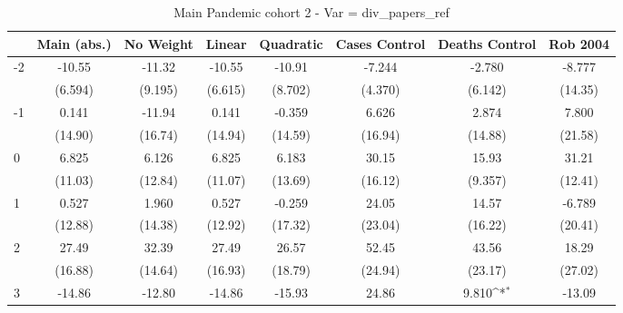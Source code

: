 \documentclass{article}
\begin{document}
{
\def\sym#1{\ifmmode^{#1}\else\(^{#1}\)\fi}
\begin{longtable}{l*{7}{c}}
\caption{Main Pandemic cohort 2 - Var = div\_papers\_ref}\\
\hline\hline\endfirsthead\hline\endhead\hline\endfoot\endlastfoot
                &\multicolumn{1}{c}{Main (abs.)}&\multicolumn{1}{c}{No Weight}&\multicolumn{1}{c}{Linear}&\multicolumn{1}{c}{Quadratic}&\multicolumn{1}{c}{Cases Control}&\multicolumn{1}{c}{Deaths Control}&\multicolumn{1}{c}{Rob 2004}\\
\hline
-2              &   -10.55         &   -11.32         &   -10.55         &   -10.91         &   -7.244         &   -2.780         &   -8.777         \\
                &  (6.594)         &  (9.195)         &  (6.615)         &  (8.702)         &  (4.370)         &  (6.142)         &  (14.35)         \\
-1              &    0.141         &   -11.94         &    0.141         &   -0.359         &    6.626         &    2.874         &    7.800         \\
                &  (14.90)         &  (16.74)         &  (14.94)         &  (14.59)         &  (16.94)         &  (14.88)         &  (21.58)         \\
0               &    6.825         &    6.126         &    6.825         &    6.183         &    30.15         &    15.93         &    31.21         \\
                &  (11.03)         &  (12.84)         &  (11.07)         &  (13.69)         &  (16.12)         &  (9.357)         &  (12.41)         \\
1               &    0.527         &    1.960         &    0.527         &   -0.259         &    24.05         &    14.57         &   -6.789         \\
                &  (12.88)         &  (14.38)         &  (12.92)         &  (17.32)         &  (23.04)         &  (16.22)         &  (20.41)         \\
2               &    27.49         &    32.39         &    27.49         &    26.57         &    52.45         &    43.56         &    18.29         \\
                &  (16.88)         &  (14.64)         &  (16.93)         &  (18.79)         &  (24.94)         &  (23.17)         &  (27.02)         \\
3               &   -14.86         &   -12.80         &   -14.86         &   -15.93         &    24.86         &    9.810\sym{*}  &   -13.09         \\

\end{longtable}}
\end{document}
